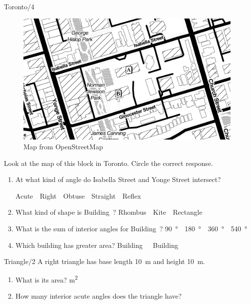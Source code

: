 \documentclass[12pt,letterpaper]{article}
\begin{document}
\begin{problem}{Toronto\hfill/4}
\begin{figure}[h]
  \begin{center}
    \includegraphics[trim=50 50 50 50, clip, width=.5\textwidth]{toronto.png}
  \end{center}
  \caption{Map from OpenStreetMap}
\end{figure}

 Look at the map of this block in Toronto. Circle the correct response.

 \begin{enumerate}
  \item At what kind of angle do Isabella Street and Yonge Street intersect?

  \hfill Acute~~Right~~Obtuse~~Straight~~Reflex

  \item What kind of shape is Building~?
  \hfill Rhombus~~Kite~~Rectangle

  \item What is the sum of interior angles for Building~? \hfill
  \SI{90}{\degree}~~\SI{180}{\degree}~~\SI{360}{\degree}~~\SI{540}{\degree}

  \item Which building has greater area?
  \hfill Building~~~Building~
 \end{enumerate}
\end{problem}

\begin{problem}{Triangle\hfill/2}
 A right triangle has base length \SI{10}{\meter} and height \SI{10}{\meter}.

 \begin{enumerate}
  \item What is its area?
  \hfill \underline{\hspace{3em}} \si{\meter^2}
  \item How many interior acute angles does the triangle have?
  \hfill \underline{\hspace{3em}}
 \end{enumerate}
\end{problem}
\end{document}
